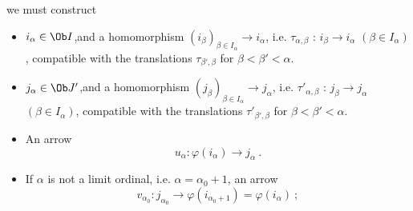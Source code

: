
we must construct

\begin{itemize}[leftmargin=*]
\item[1)] $i_\alpha\in\Ob I$,\quad and a homomorphism $(i_\beta)_{\beta\in I_\alpha}\longrightarrow i_\alpha$, i.e. $\tau_{\alpha,\beta}$ : $i_\beta\longrightarrow i_\alpha$ $(\beta\in I_\alpha)$, compatible with the translations $\tau_{\beta',\beta}$ for $\beta<\beta'<\alpha$.
\item[2)] $j_\alpha\in\Ob J'$,\quad and a homomorphism $(j_\beta)_{\beta\in I_\alpha}\longrightarrow j_\alpha$, i.e. $\tau'_{\alpha,\beta}$ : $j_\beta\longrightarrow j_\alpha$ $(\beta\in I_\alpha)$, compatible with the translations $\tau'_{\beta',\beta}$ for $\beta<\beta'<\alpha$.
\item[3)] An arrow
\[
u_\alpha:\varphi(i_\alpha)\longrightarrow j_\alpha\ .
\]
\item[4)] If $\alpha$ is not a limit ordinal, i.e. $\alpha=\alpha_0+1$, an arrow
\[
v_{\alpha_0}:j_{\alpha_0}\longrightarrow\varphi(i_{\alpha_0+1})=\varphi(i_\alpha)\ ;
\]
\end{itemize}

